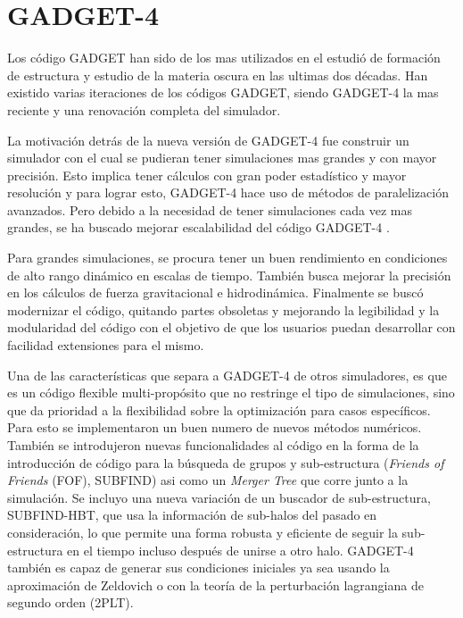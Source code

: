 \section{GADGET-4}

Los código GADGET han sido de los mas utilizados en el estudió de formación de estructura y estudio de la materia oscura en las ultimas dos décadas. Han existido varias iteraciones de los códigos GADGET, siendo GADGET-4 la mas reciente y una renovación completa del simulador. 

La motivación detrás de la nueva versión de GADGET-4 fue construir un simulador con el cual se pudieran tener simulaciones mas grandes y con mayor precisión. Esto implica tener cálculos con gran poder estadístico y mayor resolución y para lograr esto, GADGET-4 hace uso de métodos de paralelización avanzados. Pero debido a la necesidad de tener simulaciones cada vez mas grandes, se ha buscado mejorar escalabilidad del código GADGET-4 \cite{2021MNRAS.506.2871S}.

Para grandes simulaciones, se procura tener un buen rendimiento en condiciones de alto rango dinámico en escalas de tiempo. También busca mejorar la precisión en los cálculos de fuerza gravitacional e hidrodinámica. Finalmente se buscó modernizar el código, quitando partes obsoletas y mejorando la legibilidad y la modularidad del código con el objetivo de que los usuarios puedan desarrollar con facilidad extensiones para el mismo. 

 
Una de las características que separa a GADGET-4 de otros simuladores, es que es un código flexible multi-propósito que no restringe el tipo de simulaciones, sino que da prioridad a la flexibilidad  sobre la optimización para casos específicos. Para esto se implementaron un buen numero de nuevos métodos numéricos. También se introdujeron nuevas funcionalidades al código en la forma de la introducción de código para la búsqueda de grupos y sub-estructura (\textit{Friends of Friends} (FOF), SUBFIND) asi como un \textit{Merger Tree} que corre junto a la simulación. Se incluyo una nueva variación de un buscador de sub-estructura, SUBFIND-HBT, que usa la información de sub-halos del pasado en consideración, lo que permite una forma robusta y eficiente de seguir la sub-estructura en el tiempo incluso después de unirse a otro halo. GADGET-4 también es capaz de generar sus condiciones iniciales ya sea usando la aproximación de Zeldovich o con la teoría de la perturbación lagrangiana de segundo orden (2PLT)\cite{2021MNRAS.506.2871S}.


